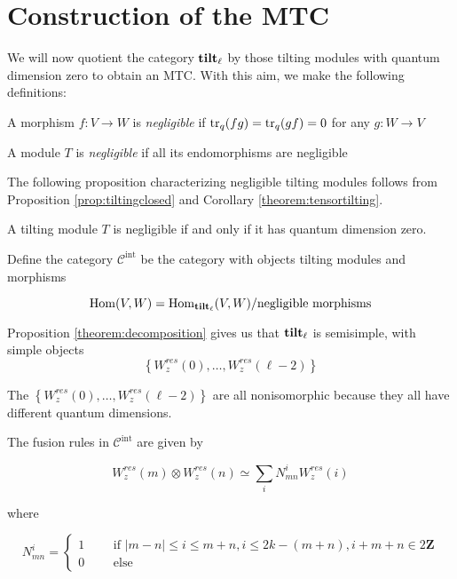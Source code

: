 \section{Construction of the MTC}
\label{MTC-construction}

We will now quotient the category $\mathbf{tilt}_\ell$ by those tilting modules with quantum
dimension zero to obtain an MTC. With this aim, we make the following
definitions:

\begin{defn}
    A morphism $f: V \to W$ is \emph{negligible} if $\operatorname{tr}_q(fg) = \operatorname{tr}_q(gf) = 0$ for any $g: W \to V$
\end{defn}

\begin{defn}
A module $T$ is \emph{negligible} if all its endomorphisms are negligible
\end{defn}

The following proposition characterizing negligible tilting modules follows
from Proposition \ref{prop:tiltingclosed} and Corollary \ref{theorem:tensortilting}.
\begin{prop}
A tilting module $T$ is negligible if and only if it has quantum dimension
zero. 
\end{prop}

Define the category $\mathcal{C}^\text{int}$ be the category with objects tilting modules and morphisms 

    \begin{equation}
        \operatorname{Hom}(V,W) = \operatorname{Hom}_{\mathbf{tilt}_\ell}(V,W) / \text{negligible morphisms}
    \end{equation}

Proposition \ref{theorem:decomposition} gives us that $\mathbf{tilt}_\ell$ is semisimple,
with simple objects 
\begin{equation}
\left\{ W_z^{res}(0), \ldots, W_z^{res}(\ell-2) \right\}
\end{equation}

The $\left\{ W_z^{res}(0), \ldots, W_z^{res}(\ell-2) \right\}$ are all
nonisomorphic because they all have different quantum dimensions.

The fusion rules in $\mathcal{C}^{\text{int}}$ are given by

\begin{equation}
    W_z^{res}(m) \otimes W_z^{res}(n) \simeq \sum_i N_{mn}^i W_z^{res}(i)
\end{equation}

where 

\begin{equation}
    N_{mn}^i = \begin{cases} 1 \qquad \text{ if } |m-n| \leq i \leq m+n, i \leq 2k - (m+n), i + m + n \in 2 \mathbf{Z} \\
                             0 \qquad \text{ else } 
               \end{cases}
\end{equation}

